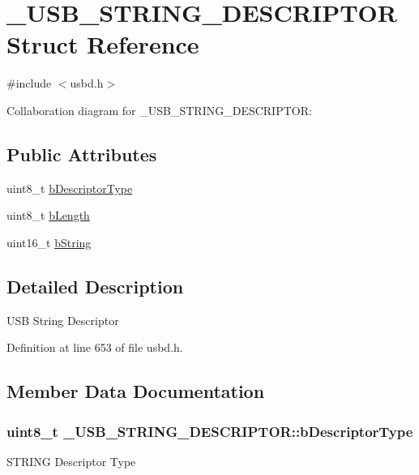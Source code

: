 \hypertarget{struct__USB__STRING__DESCRIPTOR}{}\section{\+\_\+\+U\+S\+B\+\_\+\+S\+T\+R\+I\+N\+G\+\_\+\+D\+E\+S\+C\+R\+I\+P\+T\+OR Struct Reference}
\label{struct__USB__STRING__DESCRIPTOR}


{\ttfamily \#include $<$usbd.\+h$>$}



Collaboration diagram for \+\_\+\+U\+S\+B\+\_\+\+S\+T\+R\+I\+N\+G\+\_\+\+D\+E\+S\+C\+R\+I\+P\+T\+OR\+:
\subsection*{Public Attributes}
\begin{DoxyCompactItemize}
\item 
uint8\+\_\+t \hyperlink{struct__USB__STRING__DESCRIPTOR_a03f4e8b870398d2410b49adce1466054}{b\+Descriptor\+Type}
\item 
uint8\+\_\+t \hyperlink{struct__USB__STRING__DESCRIPTOR_a27d5cd3019611e53d3588192d4c72b05}{b\+Length}
\item 
uint16\+\_\+t \hyperlink{struct__USB__STRING__DESCRIPTOR_abbe1c4825365ecb9af165153435a6ef4}{b\+String}
\end{DoxyCompactItemize}


\subsection{Detailed Description}
U\+SB String Descriptor 

Definition at line 653 of file usbd.\+h.



\subsection{Member Data Documentation}
\subsubsection[{\texorpdfstring{b\+Descriptor\+Type}{bDescriptorType}}]{\setlength{\rightskip}{0pt plus 5cm}uint8\+\_\+t \+\_\+\+U\+S\+B\+\_\+\+S\+T\+R\+I\+N\+G\+\_\+\+D\+E\+S\+C\+R\+I\+P\+T\+O\+R\+::b\+Descriptor\+Type}\hypertarget{struct__USB__STRING__DESCRIPTOR_a03f4e8b870398d2410b49adce1466054}{}\label{struct__USB__STRING__DESCRIPTOR_a03f4e8b870398d2410b49adce1466054}
S\+T\+R\+I\+NG Descriptor Type 

